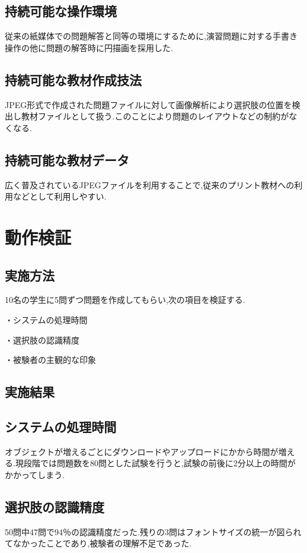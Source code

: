 \documentclass[a4j,11pt]{jsarticle}
\begin{document}
\subsection{持続可能な操作環境}
従来の紙媒体での問題解答と同等の環境にするために,演習問題に対する手書き操作の他に問題の解答時に円描画を採用した.
\subsection{持続可能な教材作成技法}
JPEG形式で作成された問題ファイルに対して画像解析により選択肢の位置を検出し教材ファイルとして扱う.このことにより問題のレイアウトなどの制約がなくなる.

\subsection{持続可能な教材データ}
広く普及されているJPEGファイルを利用することで,従来のプリント教材への利用などとして利用しやすい.



\section{動作検証}
\subsection{実施方法}
10名の学生に5問ずつ問題を作成してもらい,次の項目を検証する.

・システムの処理時間

・選択肢の認識精度

・被験者の主観的な印象

\subsection{実施結果}
\subsection{システムの処理時間}
オブジェクトが増えるごとにダウンロードやアップロードにかから時間が増える.現段階では問題数を80問とした試験を行うと,試験の前後に2分以上の時間がかかってしまう.

\subsection{選択肢の認識精度}
50問中47問で94％の認識精度だった.残りの3問はフォントサイズの統一が図られてなかったことであり,被験者の理解不足であった.
\end{document}
